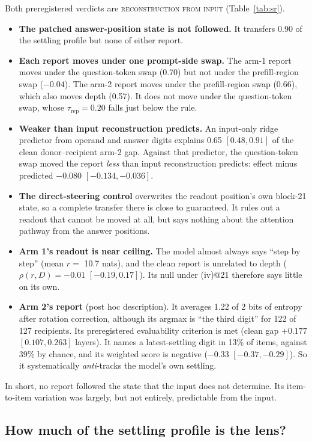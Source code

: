 \documentclass[11pt]{article}
\newcommand{\verdict}[1]{\textsc{\MakeLowercase{#1}}}
\begin{document}
Both preregistered verdicts are \verdict{RECONSTRUCTION FROM INPUT} (Table~\ref{tab:sr}).
\begin{itemize}
\item \textbf{The patched answer-position state is not followed.} It transfers 0.90 of the settling profile but none of either report.
\item \textbf{Each report moves under one prompt-side swap.} The arm-1 report moves under the question-token swap (0.70) but not under the prefill-region swap ($-0.04$). The arm-2 report moves under the prefill-region swap (0.66), which also moves depth (0.57). It does not move under the question-token swap, whose $\tau_\text{rep} = 0.20$ falls just below the rule.
\item \textbf{Weaker than input reconstruction predicts.} An input-only ridge predictor from operand and answer digits explains 0.65 $[0.48, 0.91]$ of the clean donor--recipient arm-2 gap. Against that predictor, the question-token swap moved the report \emph{less} than input reconstruction predicts: effect minus predicted $-0.080$ $[-0.134, -0.036]$.
\item \textbf{The direct-steering control} overwrites the readout position's own block-21 state, so a complete transfer there is close to guaranteed. It rules out a readout that cannot be moved at all, but says nothing about the attention pathway from the answer positions.
\item \textbf{Arm 1's readout is near ceiling.} The model almost always says ``step by step'' (mean $r = $ 10.7 nats), and the clean report is unrelated to depth ($\rho(r, D) = -0.01$ $[-0.19, 0.17]$). Its null under (iv)@21 therefore says little on its own.
\item \textbf{Arm 2's report} (post hoc description). It averages 1.22 of 2 bits of entropy after rotation correction, although its argmax is ``the third digit'' for 122 of 127 recipients. Its preregistered evaluability criterion is met (clean gap $+0.177$ $[0.107, 0.263]$ layers). It names a latest-settling digit in 13\% of items, against 39\% by chance, and its weighted score is negative ($-0.33$ $[-0.37, -0.29]$). So it systematically \emph{anti}-tracks the model's own settling.
\end{itemize}
In short, no report followed the state that the input does not determine. Its item-to-item variation was largely, but not entirely, predictable from the input.

\subsection{How much of the settling profile is the lens?}
\end{document}
